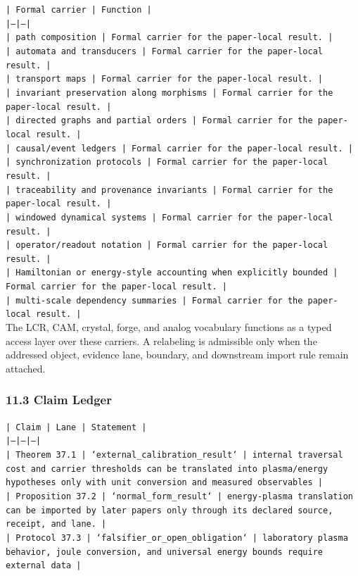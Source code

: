 \documentclass[11pt]{article}
\begin{document}
\noindent\texttt{| Formal carrier | Function |}\\
\noindent\texttt{|---|---|}\\
\noindent\texttt{| path composition | Formal carrier for the paper-local result. |}\\
\noindent\texttt{| automata and transducers | Formal carrier for the paper-local result. |}\\
\noindent\texttt{| transport maps | Formal carrier for the paper-local result. |}\\
\noindent\texttt{| invariant preservation along morphisms | Formal carrier for the paper-local result. |}\\
\noindent\texttt{| directed graphs and partial orders | Formal carrier for the paper-local result. |}\\
\noindent\texttt{| causal/event ledgers | Formal carrier for the paper-local result. |}\\
\noindent\texttt{| synchronization protocols | Formal carrier for the paper-local result. |}\\
\noindent\texttt{| traceability and provenance invariants | Formal carrier for the paper-local result. |}\\
\noindent\texttt{| windowed dynamical systems | Formal carrier for the paper-local result. |}\\
\noindent\texttt{| operator/readout notation | Formal carrier for the paper-local result. |}\\
\noindent\texttt{| Hamiltonian or energy-style accounting when explicitly bounded | Formal carrier for the paper-local result. |}\\
\noindent\texttt{| multi-scale dependency summaries | Formal carrier for the paper-local result. |}\\

The LCR, CAM, crystal, forge, and analog vocabulary functions as a typed access
layer over these carriers. A relabeling is admissible only when the addressed
object, evidence lane, boundary, and downstream import rule remain attached.

\subsubsection*{11.3 Claim Ledger}

\noindent\texttt{| Claim | Lane | Statement |}\\
\noindent\texttt{|---|---|---|}\\
\noindent\texttt{| Theorem 37.1 | `external\_calibration\_result` | internal traversal cost and carrier thresholds can be translated into plasma/energy hypotheses only with unit conversion and measured observables |}\\
\noindent\texttt{| Proposition 37.2 | `normal\_form\_result` | energy-plasma translation can be imported by later papers only through its declared source, receipt, and lane. |}\\
\noindent\texttt{| Protocol 37.3 | `falsifier\_or\_open\_obligation` | laboratory plasma behavior, joule conversion, and universal energy bounds require external data |}\\
\end{document}

